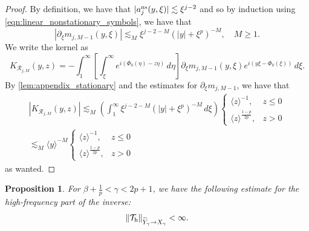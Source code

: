 \documentclass[11pt]{amsart}
\newtheorem{proposition}[theorem]{Proposition}
\theoremstyle{definition}
\theoremstyle{remark}
\numberwithin{equation}{section}
\newcommand{\sq}[1]{\widetilde{#1}}
\newcommand{\mc}[1]{\mathcal{#1}}
\newcommand{\ang}[1]{\langle #1 \rangle}
\begin{document}
\begin{proof}
    By definition, we have that $|a_{j}^{\textup{ns}}(y, \xi)| \lesssim \xi^{j - 2}$ and so by induction using \eqref{eqn:linear_nonstationary_symbols}, we have that
    \[
    |\partial_\xi m_{j,M-1}(y, \xi)| \lesssim_M \xi^{j - 2 - M}(|y| + \xi^p)^{-M}, \quad M \geq 1.
    \]
    We write the kernel as
    \[K_{\mc{R}_{j,M}}(y,z) = -\int_{1}^{\infty}\left[\int_{\xi}^{\infty}e^{i(\Phi_0(\eta) - z\eta)} \, d\eta\right]\partial_\xi m_{j,M-1}(y, \xi) e^{i(y\xi - \Phi_0(\xi))}  \,d\xi.\]
    By \cref{lem:appendix_stationary} and the estimates for $\partial_\xi m_{j,M-1}$, we have that
    \begin{align*}
        |K_{\mc{R}_{j,M}}(y,z)| \lesssim_M \left(\int_{1}^{\infty}\xi^{j - 2 - M}(|y| + \xi^p)^{-M} \, d\xi\right) \begin{cases}
        \ang{z}^{-1}, & z \leq 0 \\
        \ang{z}^{\frac{1-p}{2p}}, & z > 0
    \end{cases} \\
        \lesssim_M \ang{y}^{-M} \begin{cases}
        \ang{z}^{-1}, & z \leq 0 \\
        \ang{z}^{\frac{1-p}{2p}}, & z > 0
    \end{cases}
    \end{align*}
    as wanted.
\end{proof}

\begin{proposition}\label{prop:linear_high_frequency}
For $\beta+\frac1p<\gamma<2p+1$, we have the following estimate for the high-frequency part of the inverse:
\[\|\mc{T}_{\textup{h}}\|_{\sq{Y}_\gamma \to X_\gamma} < \infty.\]
\end{proposition}
\end{document}

